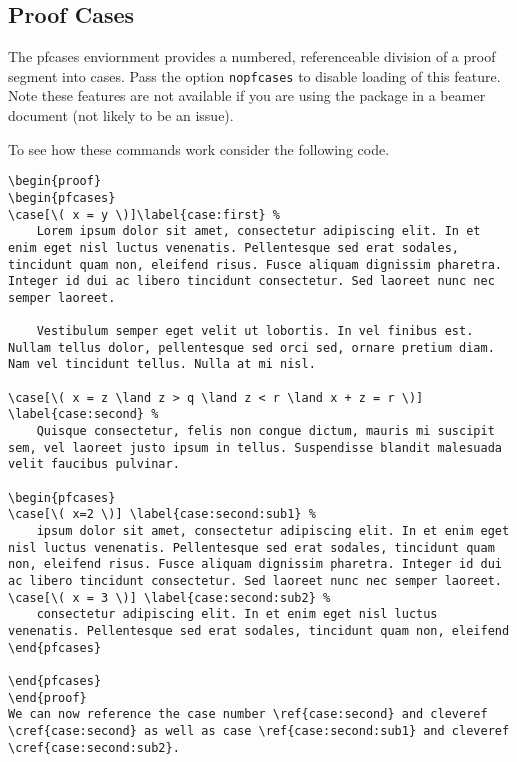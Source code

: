 \documentclass[leqno,11pt]{amsart}
\begin{document}
\subsection{Proof Cases}


The pfcases enviornment provides a numbered, referenceable division of a proof segment into cases.  Pass the option \verb=nopfcases= to disable loading of this feature.  Note these features are not available if you are using the package in a beamer document (not likely to be an issue).

To see how these commands work consider the following code.

\begin{verbatim}
\begin{proof}
\begin{pfcases}
\case[\( x = y \)]\label{case:first} %  
	Lorem ipsum dolor sit amet, consectetur adipiscing elit. In et enim eget nisl luctus venenatis. Pellentesque sed erat sodales, tincidunt quam non, eleifend risus. Fusce aliquam dignissim pharetra. Integer id dui ac libero tincidunt consectetur. Sed laoreet nunc nec semper laoreet. 

	Vestibulum semper eget velit ut lobortis. In vel finibus est. Nullam tellus dolor, pellentesque sed orci sed, ornare pretium diam. Nam vel tincidunt tellus. Nulla at mi nisl. 

\case[\( x = z \land z > q \land z < r \land x + z = r \)] \label{case:second} %
	Quisque consectetur, felis non congue dictum, mauris mi suscipit sem, vel laoreet justo ipsum in tellus. Suspendisse blandit malesuada velit faucibus pulvinar. 

\begin{pfcases}
\case[\( x=2 \)] \label{case:second:sub1} % 
	ipsum dolor sit amet, consectetur adipiscing elit. In et enim eget nisl luctus venenatis. Pellentesque sed erat sodales, tincidunt quam non, eleifend risus. Fusce aliquam dignissim pharetra. Integer id dui ac libero tincidunt consectetur. Sed laoreet nunc nec semper laoreet. 
\case[\( x = 3 \)] \label{case:second:sub2} % 
	consectetur adipiscing elit. In et enim eget nisl luctus venenatis. Pellentesque sed erat sodales, tincidunt quam non, eleifend 
\end{pfcases}

\end{pfcases}
\end{proof}
We can now reference the case number \ref{case:second} and cleveref \cref{case:second} as well as case \ref{case:second:sub1} and cleveref \cref{case:second:sub2}.
\end{verbatim}
\end{document}
